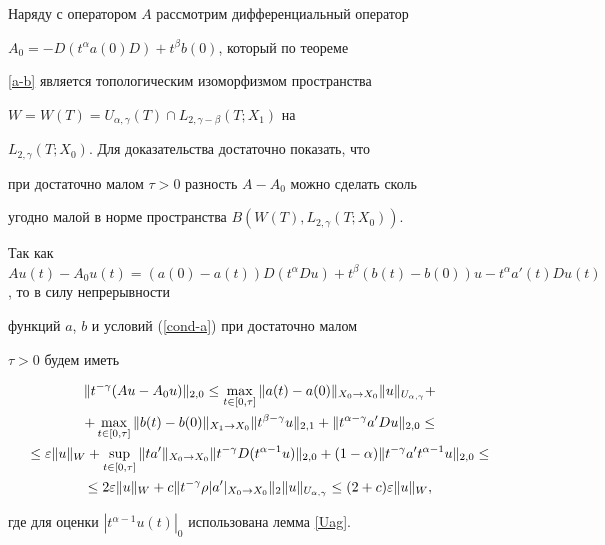 \begin{pf}


Наряду с оператором $A$ рассмотрим дифференциальный оператор


$A_0=-D(t^\alpha a(0)D )+t^\beta b(0)$, который по теореме


\ref{a-b} является топологическим изоморфизмом пространства


$W=W(T)=U_{\alpha,\gamma}(T) \cap L_{2,\gamma-\beta}(T;X_1)$ на


$L_{2,\gamma}(T;X_0)$. Для доказательства достаточно показать, что


при достаточно малом $\tau>0$ разность $A-A_0$ можно сделать сколь


угодно малой в норме пространства $B(W(T),L_{2,\gamma}(T;X_0))$.


Так как $A u (t)-A_0 u(t) = (a(0)-a(t)) D(t^\alpha D u) +t^\beta


(b(t)-b(0)) u - t^\alpha a'(t) D u(t)$, то в силу непрерывности


функций $a$, $b$ и условий (\ref{cond-a}) при достаточно малом


$\tau>0$ будем иметь


\begin{multline*}


\|t^{-\gamma}(A u - A_0 u)\|_{2,0} \le \max_{t \in


[0,\tau]} \|a(t)-a(0)\|_{X_0 \to X_0}\|u\|_{U_{\alpha,\gamma}}+ \\


%


+\max_{t \in [0,\tau]} \|b(t)-b(0)\|_{X_1 \to X_0}


\|t^{\beta-\gamma}u\|_{2,1}+\|t^{\alpha-\gamma}a'Du\|_{2,0} \le \\


%


\le\eps \|u\|_W + \sup_{t \in [0,\tau]}\|t a'\|_{X_0


\to X_0}\|t^{-\gamma}D(t^{\alpha-1}u)\|_{2,0}


+(1-\alpha)\|t^{-\gamma}a't^{\alpha-1}u\|_{2,0} \le \\


%


\le 2\eps \|u\|_W +c \|t^{-\gamma}\rho|a'|_{X_0\to X_0}


\|_2 \|u\|_{U_{\alpha,\gamma}} \le (2+c)\eps \|u\|_W,


\end{multline*}


где для оценки $|t^{\alpha-1}u(t)|_0$ использована лемма \ref{Uag}. 


\end{pf}





